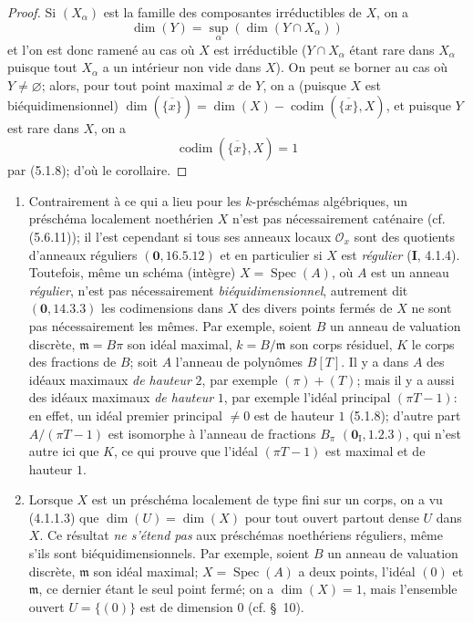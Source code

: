 \begin{proof}
Si $(X_\alpha)$ est la famille des composantes irréductibles de $X$, on a
\[
\dim(Y)=\sup_\alpha(\dim(Y\cap X_\alpha))
\]
et l'on est donc ramené au cas où $X$ est irréductible ($Y\cap X_\alpha$
étant rare dans $X_\alpha$ puisque tout $X_\alpha$ a un intérieur non vide
dans $X$). On peut se borner au cas où $Y\ne\varnothing$; alors, pour tout
point maximal $x$ de $Y$, on a (puisque $X$ est biéquidimensionnel)
$\dim(\overline{\{x\}})=\dim(X)-\operatorname{codim}(\overline{\{x\}},X)$,
et puisque $Y$ est rare dans $X$, on a
\[
\operatorname{codim}(\overline{\{x\}},X)=1
\]
par (5.1.8); d'où le corollaire.
\end{proof}

\begin{remarks}[5.2.5]
\label{IV.2.5.2.5-fr}
\begin{enumerate}
\item[(i)] Contrairement à ce qui a lieu pour les $k$-préschémas algébriques,
un préschéma localement noethérien $X$ n'est pas nécessairement caténaire
(cf. (5.6.11)); il l'est cependant si tous ses anneaux locaux $\mathcal O_x$
sont des quotients d'anneaux réguliers $(\mathbf{0},16.5.12)$ et en particulier si $X$
est \emph{régulier} (\textbf{I}, 4.1.4). Toutefois, même un schéma (intègre)
$X=\operatorname{Spec}(A)$, où $A$ est un anneau \emph{régulier}, n'est pas
nécessairement \emph{biéquidimensionnel}, autrement dit $(\mathbf{0},14.3.3)$ les
codimensions dans $X$ des divers points fermés de $X$ ne sont pas
nécessairement les mêmes. Par exemple, soient $B$ un anneau de valuation
discrète, $\mathfrak m=B\pi$ son idéal maximal, $k=B/\mathfrak m$ son corps
résiduel, $K$ le corps des fractions de $B$; soit $A$ l'anneau de polynômes
$B[T]$. Il y a dans $A$ des idéaux maximaux \emph{de hauteur} $2$, par exemple
$(\pi)+(T)$; mais il y a aussi des idéaux maximaux \emph{de hauteur} $1$, par
exemple l'idéal principal $(\pi T-1)$: en effet, un idéal premier principal
$\ne0$ est de hauteur $1$ (5.1.8); d'autre part
$A/(\pi T-1)$ est isomorphe à l'anneau de fractions $B_\pi$
$(\mathbf{0}_{\mathrm I},1.2.3)$, qui n'est autre ici que $K$, ce qui prouve que
l'idéal $(\pi T-1)$ est maximal et de hauteur $1$.

\item[(ii)] Lorsque $X$ est un préschéma localement de type fini sur un corps,
on a vu (4.1.1.3) que $\dim(U)=\dim(X)$ pour tout ouvert partout dense $U$
dans $X$. Ce résultat \emph{ne s'étend pas} aux préschémas noethériens
réguliers, même s'ils sont biéquidimensionnels. Par exemple, soient $B$ un
anneau de valuation discrète, $\mathfrak m$ son idéal maximal;
$X=\operatorname{Spec}(A)$ a deux points, l'idéal $(0)$ et $\mathfrak m$, ce
dernier étant le seul point fermé; on a $\dim(X)=1$, mais l'ensemble ouvert
$U=\{(0)\}$ est de dimension $0$ (cf. \S~10).
\end{enumerate}
\end{remarks}

